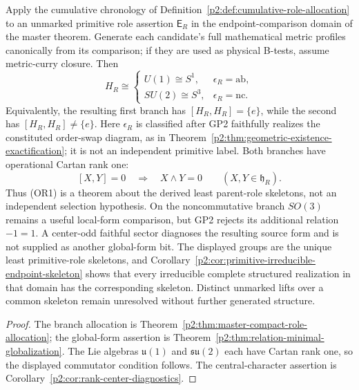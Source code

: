 \documentclass[12pt,a4paper]{article}
\begin{document}
\begin{theorem}
\label{p2:thm:dependency-complete-parent-allocation}
Apply the cumulative chronology of
Definition~\ref{p2:def:cumulative-role-allocation} to an unmarked primitive
role assertion \(\mathsf E_R\) in the endpoint-comparison domain of the master
theorem.  Generate
each candidate's full mathematical metric profiles canonically from its
comparison; if they are used as physical B-tests, assume metric-curry
closure.
Then
\[
 H_R\cong
 \begin{cases}
 U(1)\cong S^1,
 &\epsilon_R=\mathrm{ab},\\[2pt]
 SU(2)\cong S^3,
 &\epsilon_R=\mathrm{nc}.
 \end{cases}
\]
Equivalently, the resulting first branch has
\([H_R,H_R]=\{e\}\), while the second has
\([H_R,H_R]\ne\{e\}\).
Here \(\epsilon_R\) is classified after GP2 faithfully realizes the constituted
order-swap diagram, as in
Theorem~\ref{p2:thm:geometric-existence-exactification}; it is not an
independent primitive label.  Both branches have operational Cartan rank one:
\[
 [X,Y]=0\quad\Longrightarrow\quad X\wedge Y=0
 \qquad(X,Y\in\mathfrak h_R).
 \tag{OR1}
\]
Thus (OR1) is a theorem about the derived least parent-role skeletons, not an independent
selection hypothesis.  On the noncommutative branch \(SO(3)\) remains a
useful local-form comparison, but GP2 rejects its additional relation
\(-1=1\).  A center-odd faithful sector diagnoses the resulting source form and is not
supplied as another global-form bit.  The displayed groups are the unique least
primitive-role skeletons, and
Corollary~\ref{p2:cor:primitive-irreducible-endpoint-skeleton} shows that every
irreducible complete structured realization in that domain has the
corresponding skeleton.  Distinct unmarked lifts over a common skeleton remain
unresolved without further generated structure.
\end{theorem}

\begin{proof}
The branch allocation is
Theorem~\ref{p2:thm:master-compact-role-allocation}; the global-form assertion
is Theorem~\ref{p2:thm:relation-minimal-globalization}.  The Lie algebras
\(\mathfrak u(1)\) and \(\mathfrak{su}(2)\) each have Cartan rank one, so the
displayed commutator condition follows.  The central-character assertion is
Corollary~\ref{p2:cor:rank-center-diagnostics}.
\end{proof}
\end{document}
